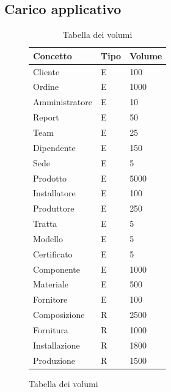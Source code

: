 \documentclass{article}
\begin{document}
\subsection{Carico applicativo}

\begin{figure}[H]
    \begin{table}[H]
        \centering
        \begin{tabular}{|l|l|l|}
            \hline
            \textbf{Concetto} & \textbf{Tipo} & \textbf{Volume} \\ \hline
            Cliente           & E             & 100              \\ \hline
            Ordine            & E             & 1000             \\ \hline
            Amministratore    & E             & 10              \\ \hline
            Report            & E             & 50               \\ \hline
            Team              & E             & 25              \\ \hline
            Dipendente        & E             & 150             \\ \hline
            Sede              & E             & 5               \\ \hline
            Prodotto          & E             & 5000            \\ \hline
            Installatore      & E             & 100             \\ \hline
            Produttore        & E             & 250             \\ \hline
            Tratta            & E             & 5               \\ \hline
            Modello           & E             & 5               \\ \hline
            Certificato       & E             & 5               \\ \hline
            Componente        & E             & 1000             \\ \hline
            Materiale         & E             & 500              \\ \hline
            Fornitore         & E             & 100              \\ \hline
            Composizione      & R             & 2500           \\ \hline
            Fornitura         & R             & 1000             \\ \hline
            Installazione     & R             & 1800            \\ \hline
            Produzione        & R             & 1500            \\ \hline
        \end{tabular}
        \caption{Tabella dei volumi}
    \end{table}
\end{figure}
\end{document}
